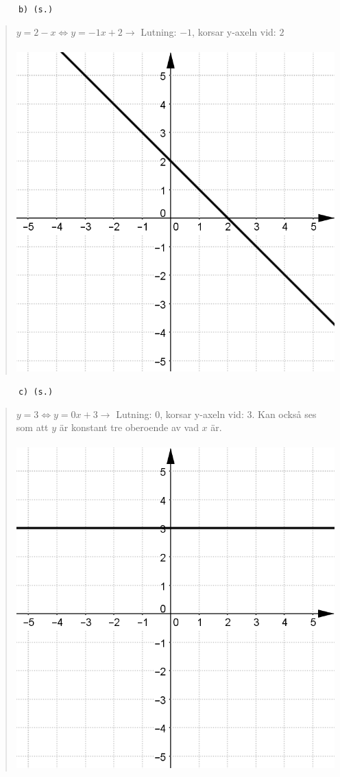 \documentclass[a4paper]{article}
\newcommand{\tskcol}[1]{\textcolor{tskcol}{#1}}
\begin{document}
	\texttt{\tskcol{~~~~~~b) (s.)}}
	\begin{quotation}
		\noindent
		$y=2-x \Leftrightarrow y=-1x+2 \rightarrow$ Lutning: $-1$, korsar y-axeln vid: $2$ \\ \\
		\includegraphics[scale=0.2]{images/51b.png}
	\end{quotation}
	
	\texttt{\tskcol{~~~~~~c) (s.)}}
	\begin{quotation}
		\noindent
		$y=3 \Leftrightarrow y=0x+3 \rightarrow$ Lutning: $0$, korsar y-axeln vid: $3$. Kan också ses som att $y$ är konstant tre oberoende av vad $x$ är. \\ \\
		\includegraphics[scale=0.2]{images/51c.png}
	\end{quotation}
	
\end{document}
